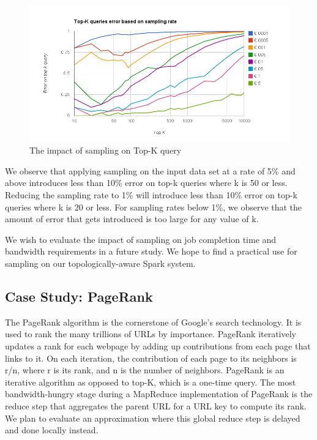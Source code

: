 \begin{figure}[ht]
    \centering
    \includegraphics[width=5in]{figs/topk_sampling.png}
    \caption{The impact of sampling on Top-K query}
    \label{fig:topk}
\end{figure}

We observe that applying sampling on the input data set at a rate of 5\% and above introduces less than 10\% error on top-k queries where k is 50 or less. Reducing the sampling rate to 1\% will introduce less than 10\% error on top-k queries where k is 20 or less. For sampling rates below 1\%, we observe that the amount of error that gets introduced is too large for any value of k. 

We wish to evaluate the impact of sampling on job completion time and bandwidth requirements in a future study. We hope to find a practical use for sampling on our topologically-aware Spark system.

\subsection{Case Study: PageRank}

The PageRank algorithm is the cornerstone of Google's search technology. It is used to rank the many trillions of URLs by importance. PageRank iteratively updates a rank for each webpage by adding up contributions from each page that links to it. On each iteration, the contribution of each page to its neighbors is r/n, where r is its rank, and n is the number of neighbors.
PageRank is an iterative algorithm as opposed to top-K, which is a one-time query. The most bandwidth-hungry stage during a MapReduce implementation of PageRank is the reduce step that aggregates the parent URL for a URL key to compute its rank. We plan to evaluate an approximation where this global reduce step is delayed and done locally instead. 

